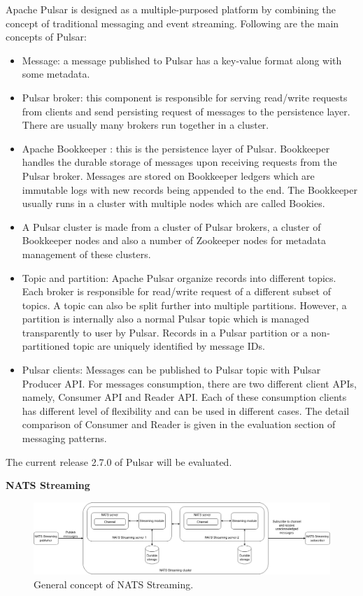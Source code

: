 Apache Pulsar is designed as a multiple-purposed platform by combining the concept of traditional messaging and event streaming. Following are the main concepts of Pulsar:
\begin{itemize}
	\item Message: a message published to Pulsar has a key-value format along with some metadata.
	\item Pulsar broker: this component is responsible for serving read/write requests from clients and send persisting request of messages to the persistence layer. There are usually many brokers run together in a cluster.
	\item Apache Bookkeeper \cite{apachebookkeeper}: this is the persistence layer of Pulsar. Bookkeeper handles the durable storage of messages upon receiving requests from the Pulsar broker. Messages are stored on Bookkeeper ledgers which are immutable logs with new records being appended to the end. The Bookkeeper usually runs in a cluster with multiple nodes which are called Bookies. 
	\item A Pulsar cluster is made from a cluster of Pulsar brokers, a cluster of Bookkeeper nodes and also a number of Zookeeper nodes for metadata management of these clusters.
	\item Topic and partition: Apache Pulsar organize records into different topics. Each broker is responsible for read/write request of a different subset of topics. A topic can also be split further into multiple partitions. However, a partition is internally also a normal Pulsar topic which is managed transparently to user by Pulsar. Records in a Pulsar partition or a non-partitioned topic are uniquely identified by message IDs.
	\item Pulsar clients: Messages can be published to Pulsar topic with Pulsar Producer API. For messages consumption, there are two different client APIs, namely, Consumer API and Reader API. Each of these consumption clients has different level of flexibility and can be used in different cases. The detail comparison of Consumer and Reader is given in the evaluation section of messaging patterns.
\end{itemize}

The current release 2.7.0 of Pulsar will be evaluated.

\textbf{NATS Streaming}
\begin{figure}[h]
	\includegraphics[width=\linewidth]{images/general-nats.png}
	\caption{General concept of NATS Streaming.}
	\label{fig:pulsargeneral}
\end{figure}

